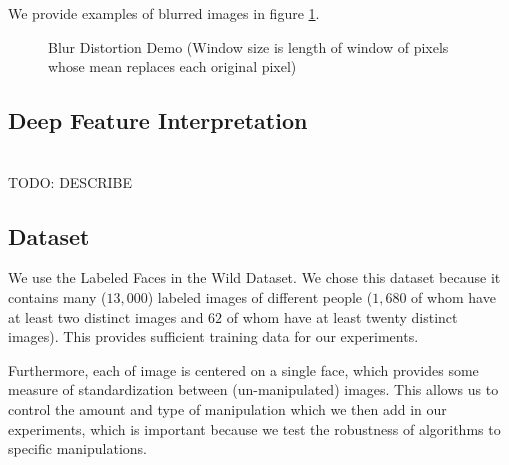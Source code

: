 \documentclass[pageno]{cos429}
\begin{document}
We provide examples of blurred images in figure \ref{fig:manipulationdemo_blur}.
\begin{figure}[!htb]
\caption{Blur Distortion Demo (Window size is length of window of pixels whose mean replaces each original pixel)}
\label{fig:manipulationdemo_blur}
\end{figure}

\subsection{Deep Feature Interpretation}\hspace*{\fill} \\
TODO: DESCRIBE

\subsection{Dataset}
We use the Labeled Faces in the Wild Dataset\cite{huang_labeled_2007}. We chose this dataset because it contains many ($13,000$) labeled images of different people ($1,680$ of whom have at least two distinct images and $62$ of whom have at least twenty distinct images). This provides sufficient training data for our experiments.

Furthermore, each of image is centered on a single face, which provides some measure of standardization between (un-manipulated) images. This allows us to control the amount and type of manipulation which we then add in our experiments, which is important because we test the robustness of algorithms to specific manipulations.
\end{document}
